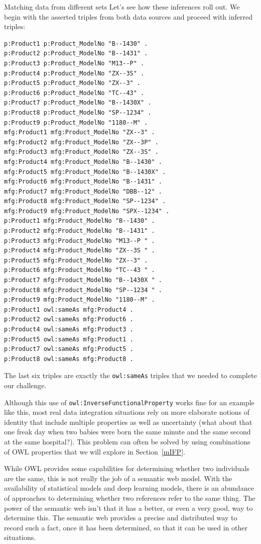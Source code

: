 \begin{challenge}{Matching data from different sets}
Let's see how these inferences roll out. We begin with the asserted
triples from both data sources and proceed with inferred triples:

\begin{lstlisting}
p:Product1 p:Product_ModelNo "B--1430" .
p:Product2 p:Product_ModelNo "B--1431" .
p:Product3 p:Product_ModelNo "M13--P" .
p:Product4 p:Product_ModelNo "ZX--3S" .
p:Product5 p:Product_ModelNo "ZX--3" .
p:Product6 p:Product_ModelNo "TC--43" .
p:Product7 p:Product_ModelNo "B--1430X" .
p:Product8 p:Product_ModelNo "SP--1234" .
p:Product9 p:Product_ModelNo "1180--M" .
mfg:Product1 mfg:Product_ModelNo "ZX--3" .
mfg:Product2 mfg:Product_ModelNo "ZX--3P" .
mfg:Product3 mfg:Product_ModelNo "ZX--3S" .
mfg:Product4 mfg:Product_ModelNo "B--1430" .
mfg:Product5 mfg:Product_ModelNo "B--1430X" .
mfg:Product6 mfg:Product_ModelNo "B--1431" .
mfg:Product7 mfg:Product_ModelNo "DBB--12" .
mfg:Product8 mfg:Product_ModelNo "SP--1234" .
mfg:Product9 mfg:Product_ModelNo "SPX--1234" .
p:Product1 mfg:Product_ModelNo "B--1430" .
p:Product2 mfg:Product_ModelNo "B--1431" .
p:Product3 mfg:Product_ModelNo "M13--P " .
p:Product4 mfg:Product_ModelNo "ZX--3S " .
p:Product5 mfg:Product_ModelNo "ZX--3" .
p:Product6 mfg:Product_ModelNo "TC--43 " .
p:Product7 mfg:Product_ModelNo "B--1430X " .
p:Product8 mfg:Product_ModelNo "SP--1234 " .
p:Product9 mfg:Product_ModelNo "1180--M" .
p:Product1 owl:sameAs mfg:Product4 .
p:Product2 owl:sameAs mfg:Product6 .
p:Product4 owl:sameAs mfg:Product3 .
p:Product5 owl:sameAs mfg:Product1 .
p:Product7 owl:sameAs mfg:Product5 .
p:Product8 owl:sameAs mfg:Product8 .
\end{lstlisting}  

The last six triples are exactly the \texttt{owl:sameAs} triples that we needed
to complete our challenge.

\end{challenge}

Although this use of \texttt{owl:InverseFunctionalProperty} works fine for an
example like this, most real data integration situations rely on more
elaborate notions of identity that include multiple properties as well
as uncertainty (what about that one freak day when two babies were born
the same minute and the same second at the same hospital?). This problem
can often be solved by using combinations of OWL properties that we will
explore in Section~\ref{mIFP}.  

While OWL provides some capabilities for determining whether two individuals are 
the same, this is not really the job of a semantic web model.  With the 
availability of statistical models and deep learning models, there is an 
abundance of approaches to determining whether two references refer to the
same thing.  The power of the semantic web isn't that it has a better, or even 
a very good, way to determine this.  The semantic web provides a precise and 
distributed way to record such a fact, once it has been determined, so that it 
can be used in other situations. 


